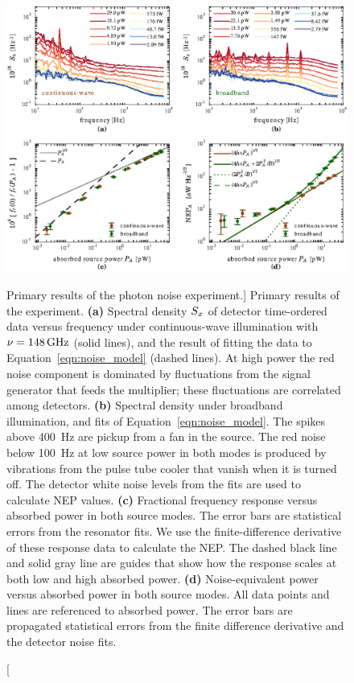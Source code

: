 \begin{figure}[p]
\centering
\includegraphics[width=\textwidth]{sensitivity/results.eps}
\caption
[Primary results of the photon noise experiment.]
{
Primary results of the experiment.
\textbf{(a)} Spectral density $S_{x}$ of detector time-ordered data versus frequency under continuous-wave illumination with $\nu = \SI{148}{GHz}$ (solid lines), and the result of fitting the data to Equation~\ref{eqn:noise_model} (dashed lines).
At high power the red noise component is dominated by fluctuations from the signal generator that feeds the multiplier; these fluctuations are correlated among detectors.
\textbf{(b)} Spectral density under broadband illumination, and fits of Equation~\ref{eqn:noise_model}.
The spikes above \SI{400}{Hz} are pickup from a fan in the source.
The red noise below \SI{100}{Hz} at low source power in both modes is produced by vibrations from the pulse tube cooler that vanish when it is turned off.
The detector white noise levels from the fits are used to calculate NEP values.
\textbf{(c)} Fractional frequency response versus absorbed power in both source modes.
The error bars are statistical errors from the resonator fits.
We use the finite-difference derivative of these response data to calculate the NEP.
The dashed black line and solid gray line are guides that show how the response scales at both low and high absorbed power.
\textbf{(d)}
Noise-equivalent power versus absorbed power in both source modes.
All data points and lines are referenced to absorbed power.
The error bars are propagated statistical errors from the finite difference derivative and the detector noise fits.
}
\end{figure}
